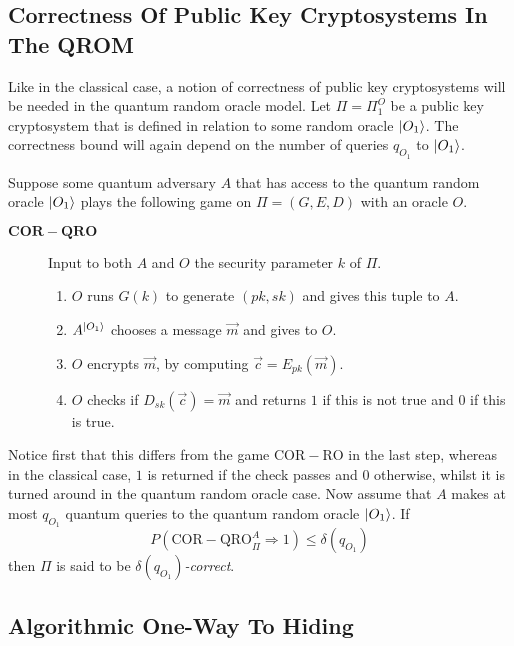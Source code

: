 \subsection{Correctness Of Public Key Cryptosystems In The QROM}
\label{subsec:corOfPubKeyCryInTheQRO}

Like in the classical case, a notion of correctness of public key cryptosystems will be needed in the quantum random oracle model. Let $\Pi = \Pi^O_1$ be a public key cryptosystem that is defined in relation to some random oracle $\lvert O_1\rangle$. The correctness bound will again depend on the number of queries $q_{O_1}$ to $\lvert O_1\rangle$.

Suppose some quantum adversary $A$ that has access to the quantum random oracle $\lvert O_1\rangle$ plays the following game on $\Pi = \left(G,E,D\right)$ with an oracle $O$.
\begin{description}
	\item[$\mathrm{\mathbf{COR-QRO}}$] Input to both $A$ and $O$ the security parameter $k$ of $\Pi$.
		\begin{enumerate}
			\item $O$ runs $G\left(k\right)$ to generate $\left(pk,sk\right)$ and gives this tuple to $A$.
			\item $A^{\lvert O_1\rangle}$ chooses a message $\vec{m}$ and gives to $O$.
			\item $O$ encrypts $\vec{m}$, by computing $\vec{c} = E_{pk}\left(\vec{m}\right)$.
			\item $O$ checks if $D_{sk}\left(\vec{c}\right) = \vec{m}$ and returns $1$ if this is not true and $0$ if this is true.
		\end{enumerate}
\end{description}
Notice first that this differs from the game $\mathrm{COR-RO}$ in the last step, whereas in the classical case, $1$ is returned if the check passes and $0$ otherwise, whilst it is turned around in the quantum random oracle case. Now assume that $A$ makes at most $q_{O_1}$ quantum queries to the quantum random oracle $\lvert O_1\rangle$. If
\[
	P\left( \mathrm{COR-QRO}^A_{\Pi} \Rightarrow 1 \right) \leq \delta\left( q_{O_1} \right)
\]
then $\Pi$ is said to be \emph{$\delta\left( q_{O_1} \right) $-correct}.



\subsection{Algorithmic One-Way To Hiding}
\label{subsec:AlgOneToHid}

